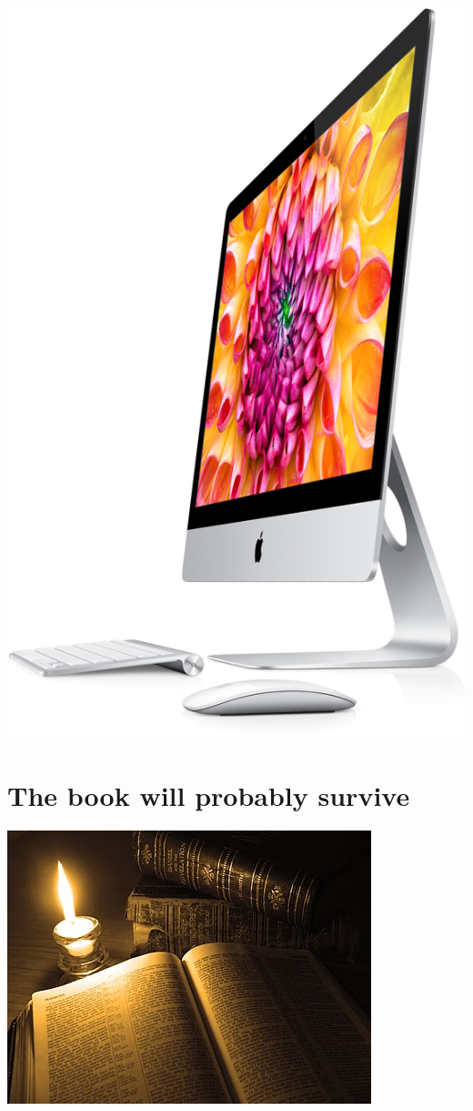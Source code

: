 \documentclass[%
oneside,                 %
final,                   %
chapterprefix=true,      %
open=right               %
10pt]{book}
\begin{document}



\begin{center}  %
  \centerline{\includegraphics[width=0.7\linewidth]{../doc/slides/fig/imac.png}}
\end{center}


\section{The book will probably survive}


\begin{center}  %
  \centerline{\includegraphics[width=0.9\linewidth]{../doc/slides/fig/oldbooks.jpg}}
\end{center}
\end{document}
